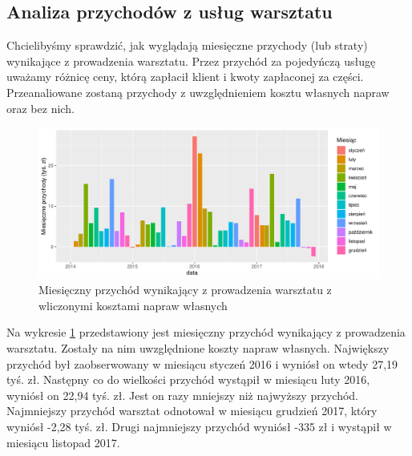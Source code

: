 \documentclass{article}\usepackage[]{graphicx}\usepackage[]{xcolor}
\makeatletter
\def\maxwidth{ %
  \ifdim\Gin@nat@width>\linewidth
    \linewidth
  \else
    \Gin@nat@width
  \fi
}
\newenvironment{knitrout}{}{} %
\makeatother
\begin{document}
\subsection{Analiza przychodów z usług warsztatu}

Chcielibyśmy sprawdzić, jak wyglądają miesięczne przychody (lub straty) wynikające z prowadzenia warsztatu. Przez przychód za pojedyńczą usługę uważamy różnicę ceny, którą zapłacił klient i kwoty zapłaconej za części. Przeanaliowane zostaną przychody z uwzględnieniem kosztu własnych napraw oraz bez nich.

\begin{knitrout}
\color{fgcolor}\begin{figure}[H]

{\centering \includegraphics[width=\maxwidth]{figure/fig_uslugi-1} 

}

\caption[Miesięczny przychód wynikający z prowadzenia warsztatu z wliczonymi kosztami napraw własnych]{Miesięczny przychód wynikający z prowadzenia warsztatu z wliczonymi kosztami napraw własnych}\label{fig:fig_uslugi}
\end{figure}

\end{knitrout}

Na wykresie \ref{fig:fig_uslugi} przedstawiony jest miesięczny przychód wynikający z prowadzenia warsztatu. Zostały na nim uwzględnione koszty napraw własnych. 
Największy przychód był zaobserwowany w miesiącu styczeń 2016 i wyniósł on wtedy 27,19 tyś. zł.
Następny co do wielkości przychód wystąpił w miesiącu luty 2016, wyniósł on 22,94 tyś. zł. Jest on  razy mniejszy niż najwyższy przychód.
Najmniejszy przychód warsztat odnotował w miesiącu grudzień 2017, który wyniósł -2,28 tyś. zł. 
Drugi najmniejszy przychód wyniósł -335 zł i wystąpił w miesiącu listopad 2017.
\end{document}
